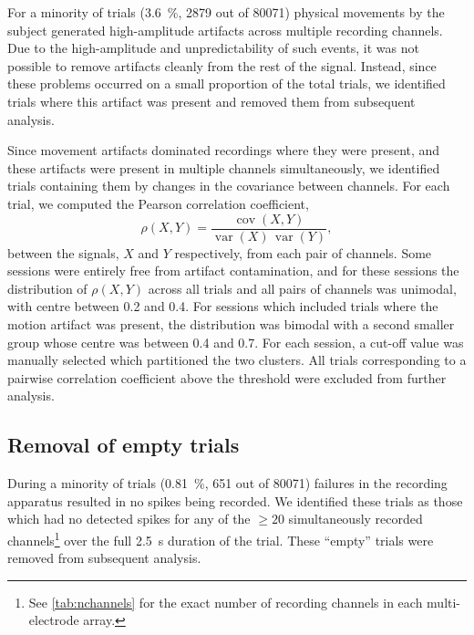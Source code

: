 For a minority of trials (\SI{3.6}{\percent}, \num{2879} out of \num{80071}) physical movements by the subject generated high-amplitude artifacts across multiple recording channels.
Due to the high-amplitude and unpredictability of such events, it was not possible to remove artifacts cleanly from the rest of the signal.
Instead, since these problems occurred on a small proportion of the total trials, we identified trials where this artifact was present and removed them from subsequent analysis.

Since movement artifacts dominated recordings where they were present, and these artifacts were present in multiple channels simultaneously, we identified trials containing them by changes in the covariance between channels.
For each trial, we computed the Pearson correlation coefficient,
\begin{equation}
\label{eq:pearson-dummy}
\rho(X,Y) = \frac{\operatorname{cov}(X,Y)}{\operatorname{var}(X) \, \operatorname{var}(Y)}
,\end{equation}
between the signals, $X$ and $Y$ respectively, from each pair of channels.
Some sessions were entirely free from artifact contamination, and for these sessions the distribution of $\rho(X,Y)$ across all trials and all pairs of channels was unimodal, with centre between \num{0.2} and \num{0.4}.
For sessions which included trials where the motion artifact was present, the distribution was bimodal with a second smaller group whose centre was between \num{0.4} and \num{0.7}.
For each session, a cut-off value was manually selected which partitioned the two clusters.
All trials corresponding to a pairwise correlation coefficient above the threshold were excluded from further analysis.



\subsection{Removal of empty trials}
\label{sec:pl_empty_trials}

During a minority of trials (\SI{0.81}{\percent}, \num{651} out of \num{80071}) failures in the recording apparatus resulted in no spikes being recorded.
We identified these trials as those which had no detected spikes for any of the ${\ge}20$ simultaneously recorded channels\footnote{See \autoref{tab:nchannels} for the exact number of recording channels in each multi-electrode array.} over the full \SI{2.5}{\second} duration of the trial.
These ``empty'' trials were removed from subsequent analysis.


